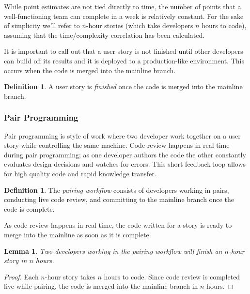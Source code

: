 \documentclass[letterpaper]{article}
\newtheorem{lemma}[theorem]{Lemma}
\theoremstyle{definition}
\newtheorem{definition}[theorem]{Definition}
\begin{document}
    While point estimates are not tied directly to time, the number of points that a well-functioning team can complete
    in a week is relatively constant.
    For the sake of simplicity we'll refer to $n$-hour stories (which take developers $n$ hours to code), assuming that
    the time/complexity correlation has been calculated.

    It is important to call out that a user story is not finished until other developers can build off its results and
    it is deployed to a production-like environment.
    This occurs when the code is merged into the mainline branch.

    \begin{definition}
        A user story is \textit{finished} once the code is merged into the mainline branch.
    \end{definition}

    \subsubsection{Pair Programming}\label{subsubsec:pairing}

    Pair programming is style of work where two developer work together on a user story while controlling the same machine.
    Code review happens in real time during pair programming;
    as one developer authors the code the other constantly evaluates design decisions and watches for errors.
    This short feedback loop allows for high quality code and rapid knowledge transfer.

    \begin{definition}
        The \textit{pairing workflow} consists of developers working in pairs, conducting live code review, and
        committing to the mainline branch once the code is complete.
    \end{definition}

    As code review happens in real time, the code written for a story is ready to merge into the mainline as soon as it
    is complete.

    \begin{lemma}
        \label{lemma:pair}
        Two developers working in the pairing workflow will finish an $n$-hour story in $n$ hours.
    \end{lemma}
    \begin{proof}
        Each $n$-hour story takes $n$ hours to code.
        Since code review is completed live while pairing, the code is merged into the mainline branch in $n$ hours.
    \end{proof}
\end{document}
